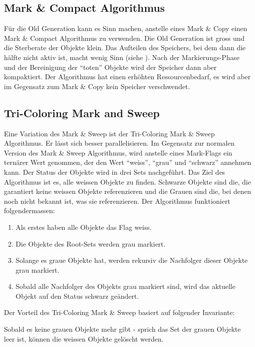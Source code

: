 \subsection{Mark \& Compact Algorithmus}
Für die Old Generation kann es Sinn machen, anstelle eines Mark \& Copy einen Mark \& Compact Algorithmus zu verwenden. Die Old Generation ist gross und die Sterberate der Objekte klein. Das Aufteilen des Speichers, bei dem dann die hälfte nicht aktiv ist, macht wenig Sinn (siehe ). Nach der Markierungs-Phase und der Bereinigung der ``toten'' Objekte wird der Speicher dann aber kompaktiert. Der Algorithmus hat einen erhöhten Ressourcenbedarf, es wird aber im Gegensatz zum Mark \& Copy kein Speicher verschwendet. 

\subsection{Tri-Coloring Mark and Sweep}\label{tri-coloring mark and sweep}
Eine Variation des Mark \& Sweep ist der Tri-Coloring Mark \& Sweep Algorithmus. Er lässt sich besser parallelisieren\cite[S. 79]{lagergren2010oracle}. Im Gegensatz zur normalen Version des Mark \& Sweep Algorithmus, wird anstelle eines Mark-Flags ein ternärer Wert genommen, der den Wert ``weiss'', ``grau'' und ``schwarz'' annehmen kann. Der Status der Objekte wird in drei Sets nachgeführt. Das Ziel des Algorithmus ist es, alle weissen Objekte zu finden. Schwarze Objekte sind die, die garantiert keine weissen Objekte referenzieren und die Grauen sind die, bei denen noch nicht bekannt ist, was sie referenzieren. Der Algorithmus funktioniert folgendermassen:

\begin{enumerate}
	\item Als erstes haben alle Objekte das Flag weiss.
	\item Die Objekte des Root-Sets werden grau markiert.
	\item Solange es graue Objekte hat, werden rekursiv die Nachfolger dieser Objekte grau markiert.
	\item Sobald alle Nachfolger des Objekts grau markiert sind, wird das aktuelle Objekt auf den Status schwarz geändert.
\end{enumerate}

Der Vorteil des Tri-Coloring Mark \& Sweep basiert auf folgender Invariante:
\begin{center}
\end{center}
Sobald es keine grauen Objekte mehr gibt - sprich das Set der grauen Objekte leer ist, können die weissen Objekte gelöscht werden.

